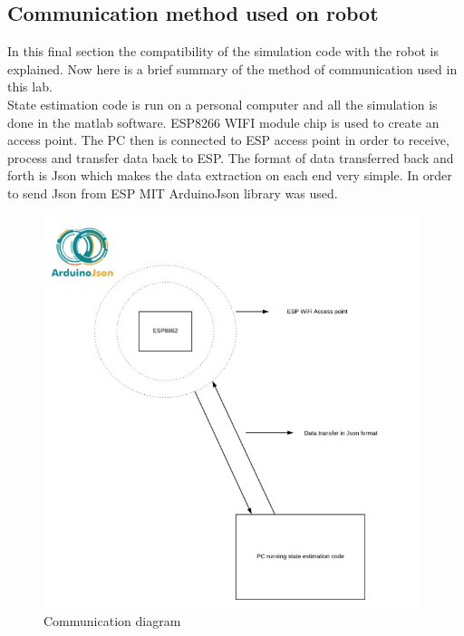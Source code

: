 \documentclass[12pt, letterpaper]{amsart} %
\numberwithin{equation}{section}
\begin{document}
\subsection{Communication method used on robot}
In this final section the compatibility of the simulation code with the robot is explained. Now here is a brief summary of the method of communication used in this lab. \\ 
State estimation code is run on a personal computer and all the simulation is done in the matlab software. ESP8266 WIFI module chip is used to create an access point. The PC then is connected to ESP access point in order to receive, process and transfer data back to ESP. The format of data transferred back and forth is Json which makes the data extraction on each end very simple. In order to send Json from ESP MIT ArduinoJson library was used. 

\begin{figure}[h!]
\includegraphics[width=110mm]{fig_3.png}
\caption{Communication diagram}
\label{fig:figure3}
\end{figure}
   
\end{document}
